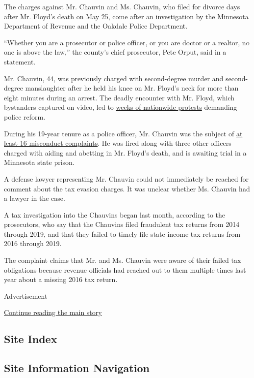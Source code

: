 The charges against Mr. Chauvin and Ms. Chauvin, who filed for divorce
days after Mr. Floyd's death on May 25, come after an investigation by
the Minnesota Department of Revenue and the Oakdale Police Department.

``Whether you are a prosecutor or police officer, or you are doctor or a
realtor, no one is above the law,'' the county's chief prosecutor, Pete
Orput, said in a statement.

Mr. Chauvin, 44, was previously charged with second-degree murder and
second-degree manslaughter after he held his knee on Mr. Floyd's neck
for more than eight minutes during an arrest. The deadly encounter with
Mr. Floyd, which bystanders captured on video, led to
\href{https://www.nytimes3xbfgragh.onion/news-event/george-floyd-protests-minneapolis-new-york-los-angeles}{weeks
of nationwide protests} demanding police reform.

During his 19-year tenure as a police officer, Mr. Chauvin was the
subject of
\href{https://www.nytimes3xbfgragh.onion/2020/06/04/us/george-floyd-police-records-chauvin.html}{at
least 16 misconduct complaints}. He was fired along with three other
officers charged with aiding and abetting in Mr. Floyd's death, and is
awaiting trial in a Minnesota state prison.

A defense lawyer representing Mr. Chauvin could not immediately be
reached for comment about the tax evasion charges. It was unclear
whether Ms. Chauvin had a lawyer in the case.

A tax investigation into the Chauvins began last month, according to the
prosecutors, who say that the Chauvins filed fraudulent tax returns from
2014 through 2019, and that they failed to timely file state income tax
returns from 2016 through 2019.

The complaint claims that Mr. and Ms. Chauvin were aware of their failed
tax obligations because revenue officials had reached out to them
multiple times last year about a missing 2016 tax return.

Advertisement

\protect\hyperlink{after-bottom}{Continue reading the main story}

\hypertarget{site-index}{%
\subsection{Site Index}\label{site-index}}

\hypertarget{site-information-navigation}{%
\subsection{Site Information
Navigation}\label{site-information-navigation}}

